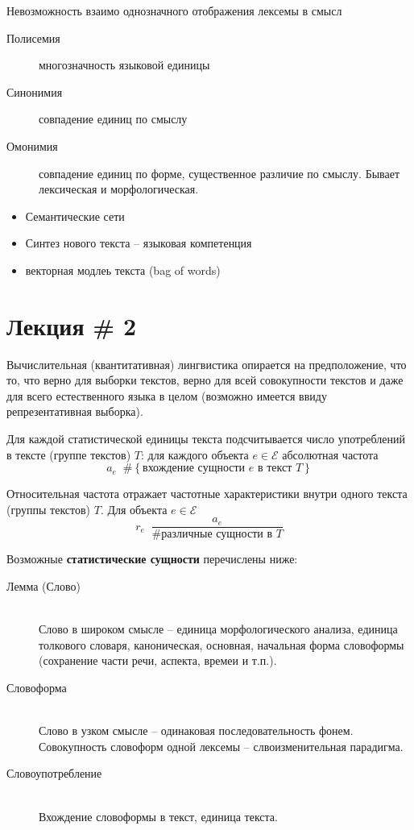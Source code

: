 \documentclass[a4paper]{article}
\newcommand{\obj}[1]{{\left\{ #1 \right \}}}
\newcommand{\defn}{\mathop{\overset{\Delta}{=}}\nolimits}
\newcommand{\eng}[1]{\foreignlanguage{english}{#1}}
\begin{document}
Невозможность взаимо однозначного отображения лексемы в смысл
\begin{description}
	\item[Полисемия] многозначность языковой единицы
	\item[Синонимия] совпадение единиц по смыслу
	\item[Омонимия] совпадение единиц по форме, существенное различие по смыслу.
	Бывает лексическая и морфологическая.
\end{description}

\begin{itemize}
	\item Семантические сети
	\item Синтез нового текста -- языковая компетенция
	\item векторная модлеь текста (\eng{bag of words})
\end{itemize}


\section{Лекция \# 2} %
\label{sec:lecture_2}

Вычислительная (квантитативная) лингвистика опирается на предположение, что то, что верно для выборки текстов, верно для всей совокупности текстов и даже для всего естественного языка в целом (возможно имеется ввиду репрезентативная выборка).

Для каждой статистической единицы текста подсчитывается число употреблений в тексте (группе текстов) $T$:
для каждого объекта $e\in \mathcal{E}$ абсолютная частота
\[a_e \defn \#\obj{\text{вхождение сущности } e \text{ в текст } T}\]

Относительная частота отражает частотные характеристики внутри одного текста (группы текстов) $T$.
Для объекта $e\in \mathcal{E}$ \[r_e \defn \frac{a_e}{\#\text{различные сущности в } T}\]

Возможные \textbf{статистические сущности} перечислены ниже:
\begin{description}
	\item[Лемма (Слово)] \hfill\\
	Слово в широком смысле -- единица морфологического анализа, единица толкового словаря, каноническая, основная, начальная форма словоформы (сохранение части речи, аспекта, времеи и т.п.).
	\item[Словоформа] \hfill\\
	Слово в узком смысле -- одинаковая последовательность фонем. Совокупность словоформ одной лексемы -- слвоизменительная парадигма.
	\item[Словоупотребление] \hfill\\
	Вхождение словоформы в текст, единица текста.
\end{description}
\end{document}
